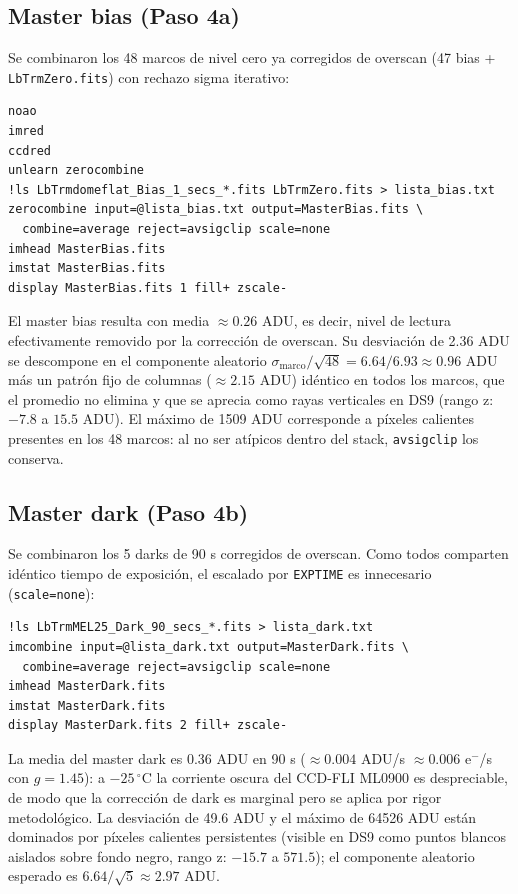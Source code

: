 \documentclass[10pt,a4paper]{article}
\begin{document}
\subsection{Master bias (Paso 4a)}

Se combinaron los 48 marcos de nivel cero ya corregidos de overscan
(47 bias + \texttt{LbTrmZero.fits}) con rechazo sigma iterativo:

\begin{lstlisting}
noao
imred
ccdred
unlearn zerocombine
!ls LbTrmdomeflat_Bias_1_secs_*.fits LbTrmZero.fits > lista_bias.txt
zerocombine input=@lista_bias.txt output=MasterBias.fits \
  combine=average reject=avsigclip scale=none
imhead MasterBias.fits
imstat MasterBias.fits
display MasterBias.fits 1 fill+ zscale-
\end{lstlisting}

\noindent El master bias resulta con media $\approx 0.26$ ADU, es decir, nivel
de lectura efectivamente removido por la corrección de overscan. Su
desviación de 2.36 ADU se descompone en el componente aleatorio
$\sigma_{\mathrm{marco}}/\sqrt{48} = 6.64/6.93 \approx 0.96$ ADU más un
patrón fijo de columnas ($\approx 2.15$ ADU) idéntico en todos los marcos, que
el promedio no elimina y que se aprecia como rayas verticales en DS9
(rango z: $-7.8$ a $15.5$ ADU). El máximo de 1509 ADU corresponde a píxeles
calientes presentes en los 48 marcos: al no ser atípicos dentro del stack,
\texttt{avsigclip} los conserva.

\subsection{Master dark (Paso 4b)}

Se combinaron los 5 darks de 90 s corregidos de overscan. Como todos comparten
idéntico tiempo de exposición, el escalado por \texttt{EXPTIME} es innecesario
(\texttt{scale=none}):

\begin{lstlisting}
!ls LbTrmMEL25_Dark_90_secs_*.fits > lista_dark.txt
imcombine input=@lista_dark.txt output=MasterDark.fits \
  combine=average reject=avsigclip scale=none
imhead MasterDark.fits
imstat MasterDark.fits
display MasterDark.fits 2 fill+ zscale-
\end{lstlisting}

\noindent La media del master dark es 0.36 ADU en 90 s
($\approx 0.004$ ADU/s $\approx 0.006$ e$^-$/s con $g=1.45$): a
$-25\,^{\circ}$C la corriente oscura del CCD-FLI ML0900 es despreciable, de
modo que la corrección de dark es marginal pero se aplica por rigor
metodológico. La desviación de 49.6 ADU y el máximo de 64526 ADU están
dominados por píxeles calientes persistentes (visible en DS9 como puntos
blancos aislados sobre fondo negro, rango z: $-15.7$ a $571.5$); el
componente aleatorio esperado es $6.64/\sqrt{5} \approx 2.97$ ADU.
\end{document}
